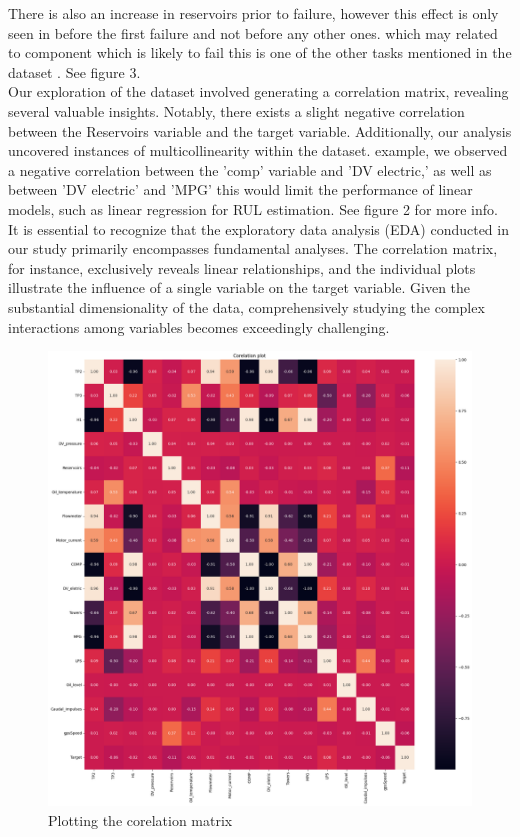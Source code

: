 \documentclass{article}
\begin{document}
There is also an increase in reservoirs prior to failure, however this effect is only seen in before the first failure and not before any other ones. which may related to component which is likely to fail this is one of the other tasks mentioned in the dataset \cite{Veloso2022}. See figure 3. \\

Our exploration of the dataset involved generating a correlation matrix, revealing several valuable insights. Notably, there exists a slight negative correlation between the Reservoirs variable and the target variable. Additionally, our analysis uncovered instances of multicollinearity within the dataset. example, we observed a negative correlation between the 'comp' variable and 'DV electric,' as well as between 'DV electric' and 'MPG' this would limit the performance of linear models, such as linear regression for RUL estimation. See figure 2 for more info.\\

It is essential to recognize that the exploratory data analysis (EDA) conducted in our study primarily encompasses fundamental analyses. The correlation matrix, for instance, exclusively reveals linear relationships, and the individual plots illustrate the influence of a single variable on the target variable. Given the substantial dimensionality of the data, comprehensively studying the complex interactions among variables becomes exceedingly challenging. \\

\begin{figure}
    \centering
    \includegraphics[width=1\linewidth]{cm.png}
    \caption{Plotting the corelation matrix}
    \label{fig:Corealtions}
\end{figure}
\end{document}
